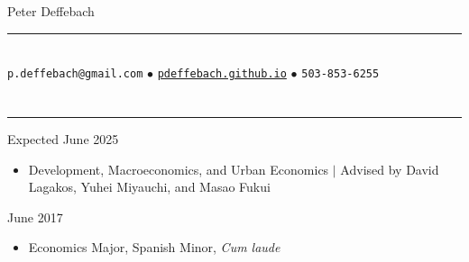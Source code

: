 \documentclass[10pt]{article}
\newenvironment{customitemize}
{ \begin{itemize}[leftmargin=\parindent, topsep = 0.2pt, itemsep = -3pt] }
{\end{itemize} }
\begin{document}
\normalsize
\singlespacing
\thispagestyle{empty}

\begin{center}
{\Large \sc Peter Deffebach} \\ 
\vspace{-5pt}
\rule{3in}{1pt} \\
\texttt{p.deffebach@gmail.com} $\bullet$ \href{https://pdeffebach.github.io/}{\texttt{pdeffebach.github.io}} $\bullet$ \texttt{503-853-6255}  \\
\end{center} 

\vspace{-12pt}
\section*{}
\noindent \rule{\textwidth}{1pt} 
  \hfill Expected June 2025
\begin{customitemize}
	\item Development, Macroeconomics, and Urban Economics $\big |$ Advised by David Lagakos, Yuhei Miyauchi, and Masao Fukui
\end{customitemize}
  \hfill June 2017
\begin{customitemize}
	\item Economics Major, Spanish Minor, \textit{Cum laude}
\end{customitemize}
\end{document}
